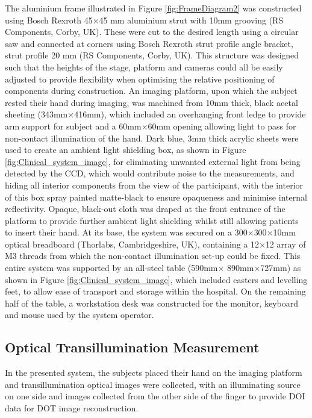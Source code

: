 \documentclass[twoside]{bhamthesis}
\theoremstyle{definition}
\begin{document}
The aluminium frame illustrated in Figure \ref{fig:FrameDiagram2} was constructed using Bosch Rexroth 45$\times$45 mm aluminium strut with 10mm grooving (RS Components, Corby, UK). These were cut to the desired length using a circular saw and connected at corners using Bosch Rexroth strut profile angle bracket, strut profile 20 mm (RS Components, Corby, UK). This structure was designed such that the heights of the stage, platform and cameras could all be easily adjusted to provide flexibility when optimising the relative positioning of components during construction. An imaging platform, upon which the subject rested their hand during imaging, was machined from 10mm thick, black acetal sheeting (343mm$\times$416mm), which included an overhanging front ledge to provide arm support for subject and a 60mm$\times$60mm opening allowing light to pass for non-contact illumination of the hand. Dark blue, 3mm thick acrylic sheets were used to create an ambient light shielding box, as shown in Figure \ref{fig:Clinical_system_image}, for eliminating unwanted external light from being detected by the CCD, which would contribute noise to the measurements, and hiding all interior components from the view of the participant, with the interior of this box spray painted matte-black to ensure opaqueness and minimise internal reflectivity. Opaque, black-out cloth was draped at the front entrance of the platform to provide further ambient light shielding whilst still allowing patients to insert their hand. At its base, the system was secured on a 300$\times$300$\times$10mm optical breadboard (Thorlabs, Cambridgeshire, UK), containing a 12$\times$12 array of M3 threads from which the non-contact illumination set-up could be fixed. This entire system was supported by an all-steel table (590mm$\times$ 890mm$\times$727mm) as shown in Figure \ref{fig:Clinical_system_image}, which included casters and levelling feet, to allow ease of transport and storage within the hospital. On the remaining half of the table, a workstation desk was constructed for the monitor, keyboard and mouse used by the system operator.

\subsection{Optical Transillumination Measurement}

In the presented system, the subjects placed their hand on the imaging platform and transillumination optical images were collected, with an illuminating source on one side and images collected from the other side of the finger to provide DOI data for DOT image reconstruction. 
\end{document}

